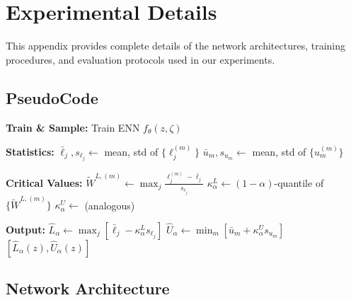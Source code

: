 \documentclass[accepted]{uai2026} %
\theoremstyle{plain}
\theoremstyle{definition}
\theoremstyle{remark}
\begin{document}
\section{Experimental Details}
\label{app:exp-details}

This appendix provides complete details of the
network architectures, training procedures, and
evaluation protocols used in our experiments.

\subsection{PseudoCode}

 \begin{algorithm2e}[htbp]
    \caption{Precision-Corrected PNS Bounds}
    \label{alg:pns_bounds}
    \small %
    
    
    
     \textbf{Train \& Sample:}\;
    Train ENN $f_\theta(z, \zeta)$\;
    
     \textbf{Statistics:}\;
    $\bar{\ell}_j, s_{\ell_j} \gets$ mean, std of $\{\ell_j^{(m)}\}$\;
    $\bar{u}_m, s_{u_m} \gets$ mean, std of $\{u_m^{(m)}\}$\;

     \textbf{Critical Values:}\;
    $\tilde{W}^{L,(m)} \gets \max_j \frac{\ell_j^{(m)} - \bar{\ell}_j}{s_{\ell_j}}$\;
    $\kappa_\alpha^L \gets (1\!-\!\alpha)$-quantile of $\{\tilde{W}^{L,(m)}\}$\;
    $\kappa_\alpha^U \gets$ (analogous)\;

     \textbf{Output:}\;
    $\hat{L}_\alpha \gets \max_j [\bar{\ell}_j - \kappa_\alpha^L s_{\ell_j}]$\;
    $\hat{U}_\alpha \gets \min_m [\bar{u}_m + \kappa_\alpha^U s_{u_m}]$\;
    \KwRet $[\hat{L}_\alpha(z), \hat{U}_\alpha(z)]$\;
    
    \end{algorithm2e}
\subsection{Network Architecture}
\label{app:architecture}
\end{document}
